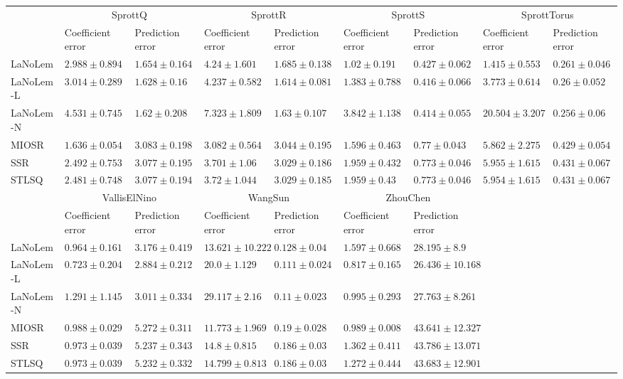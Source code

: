 \begin{table*}
{\begin{tabular}{lllllllll}
 & \multicolumn{2}{c}{SprottQ} & \multicolumn{2}{c}{SprottR} & \multicolumn{2}{c}{SprottS} & \multicolumn{2}{c}{SprottTorus} \\
 & Coefficient error & Prediction error & Coefficient error & Prediction error & Coefficient error & Prediction error & Coefficient error & Prediction error \\
\midrule
LaNoLem & $2.988\pm 0.894$ & $1.654\pm 0.164$ & $4.24\pm 1.601$ & $1.685\pm 0.138$ & $\mathbf{1.02}\pm 0.191$ & $0.427\pm 0.062$ & $\mathbf{1.415}\pm 0.553$ & $0.261\pm 0.046$ \\
LaNoLem-L & $3.014\pm 0.289$ & $1.628\pm 0.16$ & $4.237\pm 0.582$ & $\mathbf{1.614}\pm 0.081$ & $1.383\pm 0.788$ & $0.416\pm 0.066$ & $3.773\pm 0.614$ & $0.26\pm 0.052$ \\
LaNoLem-N & $4.531\pm 0.745$ & $\mathbf{1.62}\pm 0.208$ & $7.323\pm 1.809$ & $1.63\pm 0.107$ & $3.842\pm 1.138$ & $\mathbf{0.414}\pm 0.055$ & $20.504\pm 3.207$ & $\mathbf{0.256}\pm 0.06$ \\
MIOSR & $\mathbf{1.636}\pm 0.054$ & $3.083\pm 0.198$ & $\mathbf{3.082}\pm 0.564$ & $3.044\pm 0.195$ & $1.596\pm 0.463$ & $0.77\pm 0.043$ & $5.862\pm 2.275$ & $0.429\pm 0.054$ \\
SSR & $2.492\pm 0.753$ & $3.077\pm 0.195$ & $3.701\pm 1.06$ & $3.029\pm 0.186$ & $1.959\pm 0.432$ & $0.773\pm 0.046$ & $5.955\pm 1.615$ & $0.431\pm 0.067$ \\
STLSQ & $2.481\pm 0.748$ & $3.077\pm 0.194$ & $3.72\pm 1.044$ & $3.029\pm 0.185$ & $1.959\pm 0.43$ & $0.773\pm 0.046$ & $5.954\pm 1.615$ & $0.431\pm 0.067$ \\

\midrule

 & \multicolumn{2}{c}{VallisElNino} & \multicolumn{2}{c}{WangSun} & \multicolumn{2}{c}{ZhouChen} \\
 & Coefficient error & Prediction error & Coefficient error & Prediction error & Coefficient error & Prediction error \\
\midrule
LaNoLem & $0.964\pm 0.161$ & $3.176\pm 0.419$ & $13.621\pm 10.222$ & $0.128\pm 0.04$ & $1.597\pm 0.668$ & $28.195\pm 8.9$ \\
LaNoLem-L & $\mathbf{0.723}\pm 0.204$ & $\mathbf{2.884}\pm 0.212$ & $20.0\pm 1.129$ & $0.111\pm 0.024$ & $\mathbf{0.817}\pm 0.165$ & $\mathbf{26.436}\pm 10.168$ \\
LaNoLem-N & $1.291\pm 1.145$ & $3.011\pm 0.334$ & $29.117\pm 2.16$ & $\mathbf{0.11}\pm 0.023$ & $0.995\pm 0.293$ & $27.763\pm 8.261$ \\
MIOSR & $0.988\pm 0.029$ & $5.272\pm 0.311$ & $\mathbf{11.773}\pm 1.969$ & $0.19\pm 0.028$ & $0.989\pm 0.008$ & $43.641\pm 12.327$ \\
SSR & $0.973\pm 0.039$ & $5.237\pm 0.343$ & $14.8\pm 0.815$ & $0.186\pm 0.03$ & $1.362\pm 0.411$ & $43.786\pm 13.071$ \\
STLSQ & $0.973\pm 0.039$ & $5.232\pm 0.332$ & $14.799\pm 0.813$ & $0.186\pm 0.03$ & $1.272\pm 0.444$ & $43.683\pm 12.901$ \\

\bottomrule
\end{tabular}
}
\end{table*}
